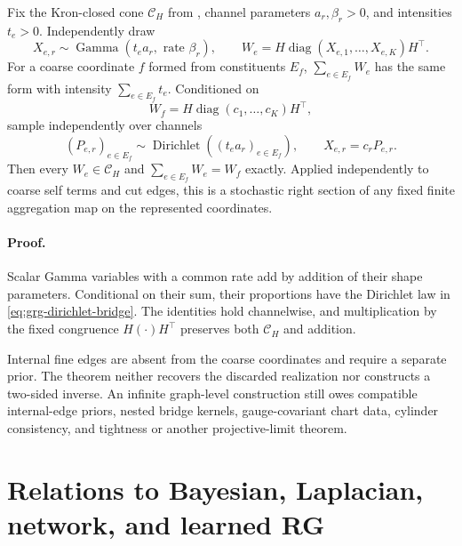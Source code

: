 Fix the Kron-closed cone
\(\mathcal C_H\) from , channel parameters
\(a_r,\beta_r>0\), and intensities \(t_e>0\).  Independently draw
\begin{equation}
X_{e,r}\sim\operatorname{Gamma}(t_ea_r,\text{ rate }\beta_r),
\qquad
W_e=H\operatorname{diag}(X_{e,1},\ldots,X_{e,K})H^\top.
\label{eq:grg-gamma-weights}
\end{equation}
For a coarse coordinate \(f\) formed from constituents \(E_f\),
\(\sum_{e\in E_f}W_e\) has the same form with intensity
\(\sum_{e\in E_f}t_e\).  Conditioned on
\[
W_f=H\operatorname{diag}(c_1,\ldots,c_K)H^\top,
\]
sample independently over channels
\begin{equation}
(P_{e,r})_{e\in E_f}
\sim\operatorname{Dirichlet}((t_ea_r)_{e\in E_f}),
\qquad
X_{e,r}=c_rP_{e,r}.
\label{eq:grg-dirichlet-bridge}
\end{equation}
Then every \(W_e\in\mathcal C_H\) and
\(\sum_{e\in E_f}W_e=W_f\) exactly.  Applied independently to coarse self
terms and cut edges, this is a stochastic right section of any fixed finite
aggregation map on the represented coordinates. 

\paragraph{Proof.}
Scalar Gamma variables with a common rate add by addition of their shape
parameters.  Conditional on their sum, their proportions have the
Dirichlet law in \eqref{eq:grg-dirichlet-bridge}.  The identities hold
channelwise, and multiplication by the fixed congruence \(H(\cdot)H^\top\)
preserves both \(\mathcal C_H\) and addition.

Internal fine edges are absent from the coarse coordinates and require a
separate prior.  The theorem neither recovers the discarded realization nor
constructs a two-sided inverse.  An infinite graph-level construction still
owes compatible internal-edge priors, nested bridge kernels, gauge-covariant
chart data, cylinder consistency, and tightness or another projective-limit
theorem. 

\section{Relations to Bayesian, Laplacian, network, and learned RG}
\label{sec:grg-literature-boundary}

